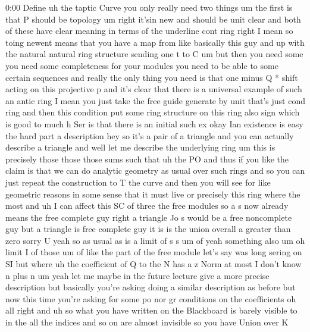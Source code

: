 \begin{unfinished}{0:00}
Define  uh  the  taptic
Curve
you  only  really  need  two
things
um  the  first  is  that  P  should  be
topology
um  right  it'sin  new  and  should  be  unit
clear  and  both  of  these  have  clear
meaning  in  terms  of  the  underline  cont
ring  right  I  mean  so  toing  newent  means
that  you  have  a  map  from  like  basically
this  guy  and  up  with  the
natural  natural  ring  structure
sending  one  t  to  C
um
but  then  you  need  some  you  need  some
completeness  for  your  modules  you  need
to  be  able  to  some  certain  sequences  and
really  the  only  thing  you  need  is  that
one  minus  Q  *
shift  acting  on  this  projective
p
and  it's  clear  that  there  is  a  universal
example  of  such  an  antic  ring  I  mean  you
just  take  the  free  guide  generate  by
unit  that's  just  cond  ring  and  then  this
condition  put  some  ring  structure  on
this
ring  also  sign  which  is
good  to
much
h
Ser  is  that  there  is  an  initial  such  ex
okay  Ian  existence  is  easy  the  hard  part
a
description  hey  so  it's  a  pair  of  a
triangle
and  you  can  actually  describe  a
triangle  and  well  let  me  describe  the
underlying  ring  um  this  is  precisely
those
those  those
sums  such  that  uh
the
PO  and  thus  if
you  like  the  claim  is  that  we  can  do
analytic  geometry  as  usual  over  such
rings
and  so  you  can  just  repeat  the
construction  to  T  the  curve  and  then  you
will  see  for  like  geometric  reasons  in
some  sense  that  it  must  live  or
precisely  this  ring  where  the
most  and  uh  I  can  affect  this  SC  of
three  the  free  modules  so  a  s  now
already  means  the  free  complete  guy
right  a  triangle  Jo  s  would  be  a  free
noncomplete  guy  but  a  triangle  is  free
complete
guy  it  is
is  the  union  overall  a  greater  than  zero
sorry  U  yeah  so  as  usual  as  is  a  limit
of
s
s
um
of  yeah  something
also
um  oh
limit
I
of  those
um  of  like  the  part  of  the
free  module  let's  say  was  long  sering  on
SI  but  where
uh  the
coefficient  of  Q  to  the
N  has  a  z
Norm  at
most  I  don't  know  n  plus
n
um  yeah  let  me  maybe  in  the  future
lecture  give  a  more  precise  description
but  basically  you're  asking  doing  a
similar  description  as  before  but  now
this  time  you're  asking  for  some  po  nor
gr  conditions  on  the
coefficients  oh  all  right  and
uh  so  what  you  have  written  on  the
Blackboard  is  barely  visible  to  in  the
all  the  indices  and  so  on  are  almost
invisible  so  you  have  Union  over  K

\end{unfinished}
